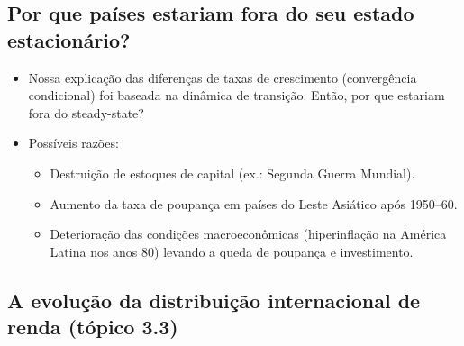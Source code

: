 \documentclass[a4paper,12pt]{article}[abntex2]
\begin{document}
\subsection{\textbf{Por que países estariam fora do seu estado estacionário?}}

\begin{itemize}
    \item Nossa explicação das diferenças de taxas de crescimento (convergência condicional) 
    foi baseada na dinâmica de transição. Então, por que estariam fora do steady-state?
    \item Possíveis razões:
    \begin{itemize}
        \item Destruição de estoques de capital (ex.: Segunda Guerra Mundial).
        \item Aumento da taxa de poupança em países do Leste Asiático após 1950--60.
        \item Deterioração das condições macroeconômicas (hiperinflação na 
              América Latina nos anos 80) levando a queda de poupança e investimento.
    \end{itemize}
\end{itemize}

\subsection{\textbf{A evolução da distribuição internacional de renda (tópico 3.3)}}
\end{document}
